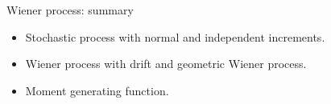 \begin{frame}{Wiener process: summary}

\begin{itemize}[<+->]
    \item Stochastic process with \alert{normal} and \alert{independent increments}.
    \item Wiener process with \alert{drift} and \alert{geometric Wiener process}. 
    \item \alert{Moment generating function}. 
\end{itemize}
  
\end{frame}
